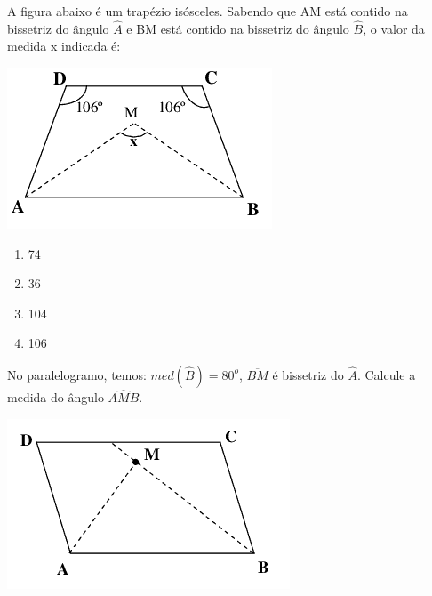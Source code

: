 				\item A figura abaixo é um trapézio isósceles. Sabendo que AM está contido na bissetriz do ângulo $\widehat{A}$ e BM está contido na bissetriz do ângulo $\widehat{B}$, o valor da medida x indicada é:
				\begin{center}
				\includegraphics[scale=0.7]{figuras/fig40}
				\end{center}
				
				\begin{multicols}{4}
				\begin{enumerate}
					\item 74
					\item 36
					\item 104
					\item 106
				\end{enumerate}
				\end{multicols}
				
				\item No paralelogramo, temos: $med(\widehat{B}) = 80^o$, $\overline{BM}$ é bissetriz do $\widehat{A}$. Calcule a medida do ângulo $A\widehat{M}B$.
				
				\begin{center}
				\includegraphics[scale=0.7]{figuras/fig41}
				\end{center}
			

